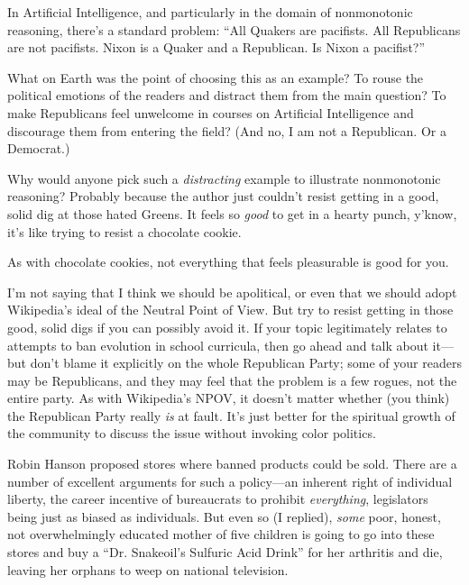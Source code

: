 {
 In Artificial Intelligence, and particularly in the domain of
nonmonotonic reasoning, there's a standard problem:
``All Quakers are pacifists. All Republicans are not
pacifists. Nixon is a Quaker and a Republican. Is Nixon a
pacifist?''}

{
 What on Earth was the point of choosing this as an example? To
rouse the political emotions of the readers and distract them from the
main question? To make Republicans feel unwelcome in courses on
Artificial Intelligence and discourage them from entering the field?
(And no, I am not a Republican. Or a Democrat.)}

{
 Why would anyone pick such a \textit{distracting} example to
illustrate nonmonotonic reasoning? Probably because the author just
couldn't resist getting in a good, solid dig at those
hated Greens. It feels so \textit{good} to get in a hearty punch,
y'know, it's like trying to resist a
chocolate cookie.}

{
 As with chocolate cookies, not everything that feels pleasurable
is good for you.}

{
 I'm not saying that I think we should be
apolitical, or even that we should adopt Wikipedia's
ideal of the Neutral Point of View. But try to resist getting in those
good, solid digs if you can possibly avoid it. If your topic
legitimately relates to attempts to ban evolution in school curricula,
then go ahead and talk about it---but don't blame it
explicitly on the whole Republican Party; some of your readers may be
Republicans, and they may feel that the problem is a few rogues, not
the entire party. As with Wikipedia's NPOV, it
doesn't matter whether (you think) the Republican Party
really \textit{is} at fault. It's just better for the
spiritual growth of the community to discuss the issue without invoking
color politics.}

\myendsectiontext


{
 Robin Hanson proposed stores where banned products could be sold.
There are a number of excellent arguments for such a policy---an
inherent right of individual liberty, the career incentive of
bureaucrats to prohibit \textit{everything}, legislators being just as
biased as individuals. But even so (I replied), \textit{some} poor,
honest, not overwhelmingly educated mother of five children is going to
go into these stores and buy a ``Dr.
Snakeoil's Sulfuric Acid Drink'' for
her arthritis and die, leaving her orphans to weep on national
television. }

